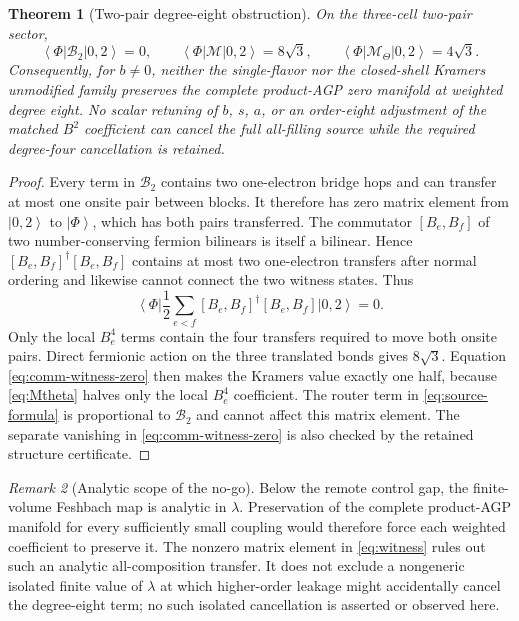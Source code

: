 \documentclass[11pt]{article}
\newtheorem{theorem}{Theorem}[section]
\theoremstyle{definition}
\theoremstyle{remark}
\newtheorem{remark}[theorem]{Remark}
\newcommand{\cM}{\mathcal M}
\newcommand{\cB}{\mathcal B}
\newcommand{\ket}[1]{\left|#1\right\rangle}
\newcommand{\bra}[1]{\left\langle#1\right|}
\begin{document}
\begin{theorem}[Two-pair degree-eight obstruction]
\label{thm:obstruction}
On the three-cell two-pair sector,
\begin{equation}
 \bra\Phi\cB_2\ket{0,2}=0,
 \qquad
 \bra\Phi\cM\ket{0,2}=8\sqrt3,
 \qquad
 \bra\Phi\cM_\Theta\ket{0,2}=4\sqrt3.
 \label{eq:witness}
\end{equation}
Consequently, for $b\ne0$, neither the single-flavor nor the closed-shell Kramers unmodified family preserves the complete product-AGP zero manifold at weighted degree eight.  No scalar retuning of $b$, $s$, $a$, or an order-eight adjustment of the matched $B^2$ coefficient can cancel the full all-filling source while the required degree-four cancellation is retained.
\end{theorem}

\begin{proof}
Every term in $\cB_2$ contains two one-electron bridge hops and can transfer at most one onsite pair between blocks.  It therefore has zero matrix element from $\ket{0,2}$ to $\ket\Phi$, which has both pairs transferred.  The commutator $[B_e,B_f]$ of two number-conserving fermion bilinears is itself a bilinear.  Hence $[B_e,B_f]^\dagger[B_e,B_f]$ contains at most two one-electron transfers after normal ordering and likewise cannot connect the two witness states.  Thus
\begin{equation}
 \bra\Phi\frac12\sum_{e<f}[B_e,B_f]^\dagger[B_e,B_f]
 \ket{0,2}=0.
 \label{eq:comm-witness-zero}
\end{equation}
Only the local $B_e^4$ terms contain the four transfers required to move both onsite pairs.  Direct fermionic action on the three translated bonds gives
$8\sqrt3$.  Equation \eqref{eq:comm-witness-zero} then makes the Kramers value
exactly one half, because \eqref{eq:Mtheta} halves only the local $B_e^4$
coefficient.  The router term in \eqref{eq:source-formula} is proportional to
$\cB_2$ and cannot affect this matrix element.  The separate vanishing in
\eqref{eq:comm-witness-zero} is also checked by the retained structure
certificate.
\end{proof}

\begin{remark}[Analytic scope of the no-go]
Below the remote control gap, the finite-volume Feshbach map is analytic in
$\lambda$.  Preservation of the complete product-AGP manifold for every
sufficiently small coupling would therefore force each weighted coefficient to
preserve it.  The nonzero matrix element in \eqref{eq:witness} rules out such an
analytic all-composition transfer.  It does not exclude a nongeneric isolated
finite value of $\lambda$ at which higher-order leakage might accidentally
cancel the degree-eight term; no such isolated cancellation is asserted or
observed here.
\end{remark}
\end{document}
